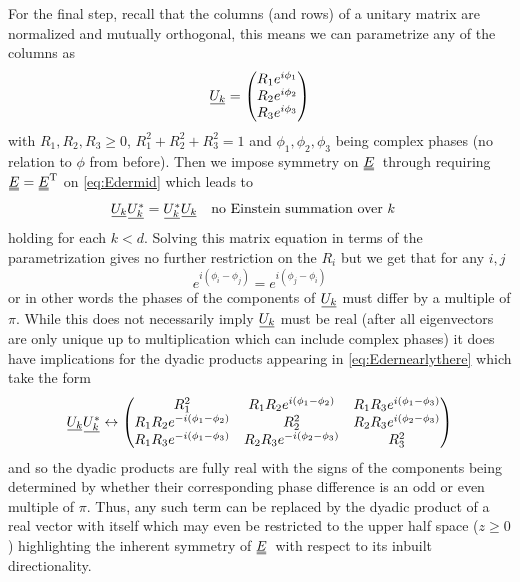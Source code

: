 \documentclass[12pt]{article}
\newcommand{\suf}[2]{\stackunder[0.5pt]{\stackunder[1pt]{\ensuremath{#1}}{\rule{\widthof{\ensuremath{#2}}*\real{0.9}}{.1ex}}}{}}
\newcommand{\duf}[2]{\stackunder[0.5pt]{\stackunder[0.8pt]{\stackunder[1pt]{\ensuremath{#1}}{\rule{\widthof{\ensuremath{#2}}*\real{0.9}}{.1ex}}}{\rule{\widthof{\ensuremath{#2}}*\real{0.9}}{.1ex}}}{}}
\newcommand{\su}[1]{\suf{#1}{#1}}
\newcommand{\du}[1]{\duf{#1}{#1}}
\newcommand{\EE}{\ensuremath{\du{E}}}
\begin{document}
        For the final step, recall that the columns (and rows) of a unitary matrix are normalized and mutually orthogonal, this means we can parametrize any of the columns as
        \begin{equation}
            \su{U_k} = \begin{pmatrix} R_1 e^{i\phi_1} \\ R_2 e^{i\phi_2} \\ R_3 e^{i\phi_3} \end{pmatrix}
        \end{equation}
        with $R_1, R_2, R_3 \geq 0$, $R_1^2+R_2^2+R_3^2 = 1$ and $\phi_1,\phi_2,\phi_3$ being complex phases (no relation to $\phi$ from before).
        Then we impose symmetry on \EE\ through requiring $\EE=\EE^\text{T}$ on \cref{eq:Edermid} which leads to
        \begin{equation}
            \su{U_k}\su{U_k^*} = \su{U_k^*}\su{U_k} \qq{no Einstein summation over $k$}
        \end{equation}
        holding for each $k < d$.
        Solving this matrix equation in terms of the parametrization gives no further restriction on the $R_i$ but we get that for any $i, j$
        \begin{equation}
            e^{i(\phi_i - \phi_j)} = e^{i(\phi_j - \phi_i)}
        \end{equation}
        or in other words the phases of the components of $\su{U_k}$ must differ by a multiple of $\pi$.
        While this does not necessarily imply $\su{U_k}$ must be real (after all eigenvectors are only unique up to multiplication which can include complex phases) it does have implications for the dyadic products appearing in \cref{eq:Edernearlythere} which take the form
        \begin{equation}
            \su{U_k}\su{U_k^*} \leftrightarrow \begin{pmatrix}
                R_1^2 & R_1 R_2 e^{i(\phi_1-\phi_2)} & R_1 R_3 e^{i(\phi_1-\phi_3)} \\
                R_1 R_2 e^{-i(\phi_1-\phi_2)} & R_2^2 & R_2 R_3 e^{i(\phi_2-\phi_3)} \\
                R_1 R_3 e^{-i(\phi_1-\phi_3)} & R_2 R_3 e^{-i(\phi_2-\phi_3)} & R_3^2
            \end{pmatrix}
        \end{equation}
        and so the dyadic products are fully real with the signs of the components being determined by whether their corresponding phase difference is an odd or even multiple of $\pi$.
        Thus, any such term can be replaced by the dyadic product of a real vector with itself which may even be restricted to the upper half space ($z \geq 0$) highlighting the inherent symmetry of \EE\ with respect to its inbuilt directionality.
\end{document}
